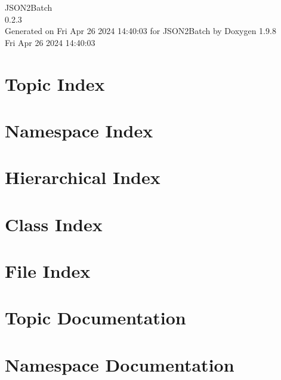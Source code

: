 \documentclass[twoside]{book}
\newcommand{\+}{\discretionary{\mbox{\scriptsize$\hookleftarrow$}}{}{}}
\newcommand{\clearemptydoublepage}{%
    \newpage{\pagestyle{empty}\cleardoublepage}%
  }
\begin{document}
  \raggedbottom
    \hypersetup{pageanchor=false,
                bookmarksnumbered=true,
                pdfencoding=unicode
               }
  \begin{titlepage}
  \vspace*{7cm}
  \begin{center}%
  {\Large JSON2\+Batch}\\
  [1ex]\large 0.\+2.\+3 \\
  \vspace*{1cm}
  {\large Generated on Fri Apr 26 2024 14\+:40\+:03 for JSON2\+Batch by Doxygen 1.9.8}\\
    \vspace*{0.5cm}
    {\small Fri Apr 26 2024 14:40:03}
  \end{center}
  \end{titlepage}
  \clearemptydoublepage
  \tableofcontents
  \clearemptydoublepage
  \hypersetup{pageanchor=true}

\chapter{Topic Index}

\chapter{Namespace Index}

\chapter{Hierarchical Index}

\chapter{Class Index}

\chapter{File Index}

\chapter{Topic Documentation}

\chapter{Namespace Documentation}





\end{document}
